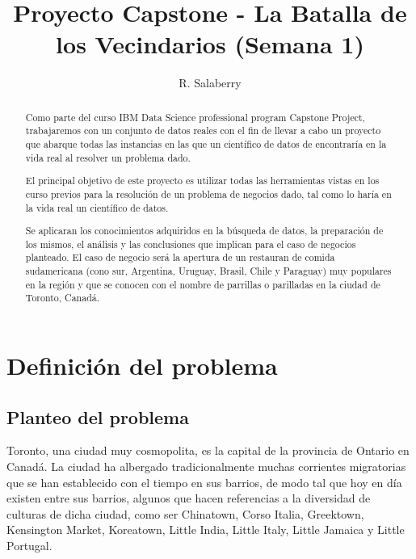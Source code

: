 \documentclass[11pt,a4paper,sans, spanish]{article}
\title{Proyecto Capstone - La Batalla de los Vecindarios (Semana 1)}
\author{R. Salaberry}
\begin{document}
\maketitle

\begin{abstract}
	Como parte del curso IBM Data Science professional program Capstone Project, trabajaremos con un conjunto de datos reales con el fin de llevar a cabo un proyecto que abarque todas las instancias en las que un científico de datos de encontraría en la vida real al resolver un problema dado.
	
	El principal objetivo de este proyecto es utilizar todas las herramientas vistas en los curso previos para la resolución de un problema de negocios dado, tal como lo haría en la vida real un científico de datos. 
	
	Se aplicaran los conocimientos adquiridos en la búsqueda de datos, la preparación de los mismos, el análisis y las conclusiones que implican para el caso de negocios planteado.
	El caso de negocio será la apertura de un restauran de comida sudamericana (cono sur, Argentina, Uruguay, Brasil, Chile y Paraguay) muy populares en la región y que se conocen con el nombre de parrillas o parilladas en la ciudad de Toronto, Canadá. 
	 
	
\end{abstract}


\tableofcontents
\section{Definición del problema}
\subsection{Planteo del problema}
Toronto, una ciudad muy cosmopolita,  es la capital de la provincia de Ontario en Canadá. La ciudad ha albergado tradicionalmente muchas corrientes migratorias que se han establecido con el tiempo en sus barrios, de modo tal que hoy en día existen entre sus barrios, algunos que hacen referencias a la diversidad de culturas de dicha ciudad, como ser Chinatown, Corso Italia, Greektown, Kensington Market, Koreatown, Little India, Little Italy, Little Jamaica y Little Portugal.
\end{document}
